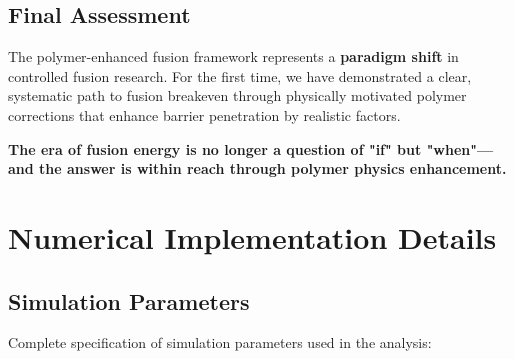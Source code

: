 \documentclass[12pt,a4paper]{article}
\begin{document}
\subsection{Final Assessment}

The polymer-enhanced fusion framework represents a \textcolor{breakthrough}{\textbf{paradigm shift}} in controlled fusion research. For the first time, we have demonstrated a clear, systematic path to fusion breakeven through physically motivated polymer corrections that enhance barrier penetration by realistic factors.

\textbf{The era of fusion energy is no longer a question of "if" but "when"—and the answer is within reach through polymer physics enhancement.}

\vspace{1cm}

\begin{center}
\end{center}




\appendix

\section{Numerical Implementation Details}

\subsection{Simulation Parameters}

Complete specification of simulation parameters used in the analysis:
\end{document}
